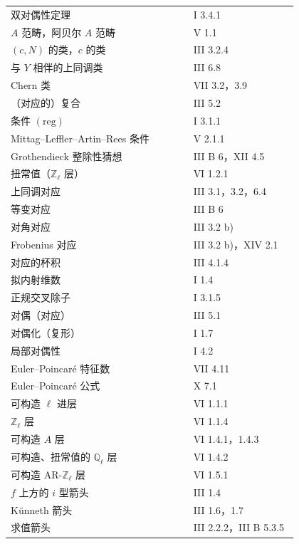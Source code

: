 \begin{longtable}{@{}p{0.61\linewidth}p{0.35\linewidth}@{}}
双对偶性定理 & I 3.4.1\\
$A$ 范畴，阿贝尔 $A$ 范畴 & V 1.1\\
$(c,N)$ 的类，$c$ 的类 & III 3.2.4\\
与 $Y$ 相伴的上同调类 & III 6.8\\
Chern 类 & VII 3.2，3.9\\
（对应的）复合 & III 5.2\\
条件 $(\mathrm{reg})$ & I 3.1.1\\
Mittag--Leffler--Artin--Rees 条件 & V 2.1.1\\
Grothendieck 整除性猜想 & III B 6，XII 4.5\\
扭常值（$\mathbb Z_\ell$ 层） & VI 1.2.1\\
上同调对应 & III 3.1，3.2，6.4\\
等变对应 & III B 6\\
对角对应 & III 3.2 b)\\
Frobenius 对应 & III 3.2 b)，XIV 2.1\\
对应的杯积 & III 4.1.4\\
拟内射维数 & I 1.4\\
正规交叉除子 & I 3.1.5\\
对偶（对应） & III 5.1\\
对偶化（复形） & I 1.7\\
局部对偶性 & I 4.2\\
Euler--Poincaré 特征数 & VII 4.11\\
Euler--Poincaré 公式 & X 7.1\\
可构造 $\ell$ 进层 & VI 1.1.1\\
$\mathbb Z_\ell$ 层 & VI 1.1.4\\
可构造 $A$ 层 & VI 1.4.1，1.4.3\\
可构造、扭常值的 $\mathbb Q_\ell$ 层 & VI 1.4.2\\
可构造 AR-$\mathbb Z_\ell$ 层 & VI 1.5.1\\
$f$ 上方的 $i$ 型箭头 & III 1.4\\
Künneth 箭头 & III 1.6，1.7\\
求值箭头 & III 2.2.2，III B 5.3.5
\end{longtable}

